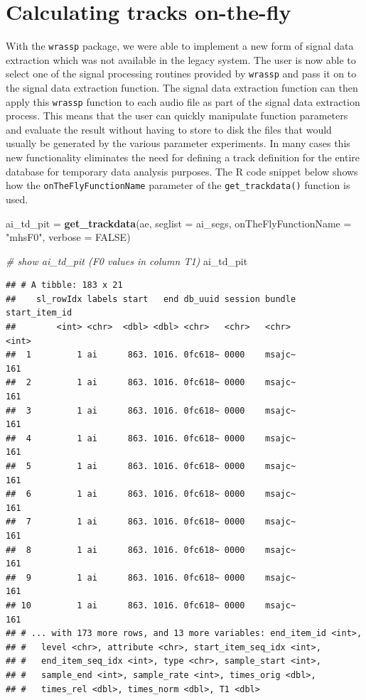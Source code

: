\documentclass[]{book}
\newenvironment{Shaded}{\begin{snugshade}}{\end{snugshade}}
\newcommand{\CommentTok}[1]{\textcolor[rgb]{0.56,0.35,0.01}{\textit{#1}}}
\newcommand{\DataTypeTok}[1]{\textcolor[rgb]{0.13,0.29,0.53}{#1}}
\newcommand{\KeywordTok}[1]{\textcolor[rgb]{0.13,0.29,0.53}{\textbf{#1}}}
\newcommand{\NormalTok}[1]{#1}
\newcommand{\OtherTok}[1]{\textcolor[rgb]{0.56,0.35,0.01}{#1}}
\newcommand{\StringTok}[1]{\textcolor[rgb]{0.31,0.60,0.02}{#1}}
\begin{document}
\hypertarget{calculating-tracks-on-the-fly}{%
\section{Calculating tracks on-the-fly}\label{calculating-tracks-on-the-fly}}

With the \texttt{wrassp} package, we were able to implement a new form of signal data extraction which was not available in the legacy system. The user is now able to select one of the signal processing routines provided by \texttt{wrassp} and pass it on to the signal data extraction function. The signal data extraction function can then apply this \texttt{wrassp} function to each audio file as part of the signal data extraction process. This means that the user can quickly manipulate function parameters and evaluate the result without having to store to disk the files that would usually be generated by the various parameter experiments. In many cases this new functionality eliminates the need for defining a track definition for the entire database for temporary data analysis purposes. The R code snippet below shows how the \texttt{onTheFlyFunctionName} parameter of the \texttt{get\_trackdata()} function is used.

\begin{Shaded}
\begin{Highlighting}[]
\NormalTok{ai_td_pit =}\StringTok{ }\KeywordTok{get_trackdata}\NormalTok{(ae,}
                          \DataTypeTok{seglist =}\NormalTok{ ai_segs,}
                          \DataTypeTok{onTheFlyFunctionName =} \StringTok{"mhsF0"}\NormalTok{,}
                          \DataTypeTok{verbose =} \OtherTok{FALSE}\NormalTok{)}

\CommentTok{# show ai_td_pit (F0 values in column T1)}
\NormalTok{ai_td_pit}
\end{Highlighting}
\end{Shaded}

\begin{verbatim}
## # A tibble: 183 x 21
##    sl_rowIdx labels start   end db_uuid session bundle start_item_id
##        <int> <chr>  <dbl> <dbl> <chr>   <chr>   <chr>          <int>
##  1         1 ai      863. 1016. 0fc618~ 0000    msajc~           161
##  2         1 ai      863. 1016. 0fc618~ 0000    msajc~           161
##  3         1 ai      863. 1016. 0fc618~ 0000    msajc~           161
##  4         1 ai      863. 1016. 0fc618~ 0000    msajc~           161
##  5         1 ai      863. 1016. 0fc618~ 0000    msajc~           161
##  6         1 ai      863. 1016. 0fc618~ 0000    msajc~           161
##  7         1 ai      863. 1016. 0fc618~ 0000    msajc~           161
##  8         1 ai      863. 1016. 0fc618~ 0000    msajc~           161
##  9         1 ai      863. 1016. 0fc618~ 0000    msajc~           161
## 10         1 ai      863. 1016. 0fc618~ 0000    msajc~           161
## # ... with 173 more rows, and 13 more variables: end_item_id <int>,
## #   level <chr>, attribute <chr>, start_item_seq_idx <int>,
## #   end_item_seq_idx <int>, type <chr>, sample_start <int>,
## #   sample_end <int>, sample_rate <int>, times_orig <dbl>,
## #   times_rel <dbl>, times_norm <dbl>, T1 <dbl>
\end{verbatim}
\end{document}
